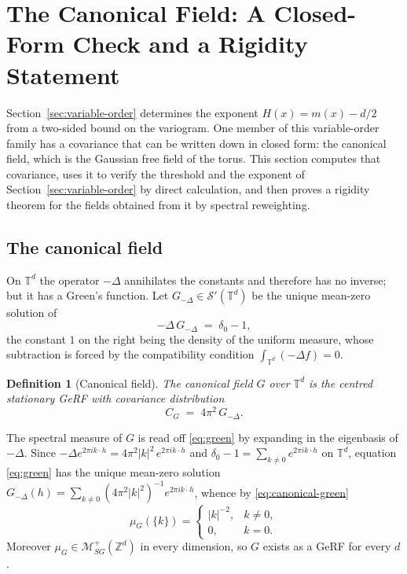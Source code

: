 \documentclass[pdflatex,sn-mathphys,Numbered]{sn-jnl}
\theoremstyle{thmstyleone}%
\theoremstyle{thmstyletwo}%
\theoremstyle{thmstylethree}%
\newtheorem{definition}[theorem]{Definition}%
\newcommand{\ZZ}{\mathbb{Z}}
\newcommand{\TT}{\mathbb{T}}
\newcommand{\calS}{\mathcal{S}}
\newcommand{\calM}{\mathcal{M}}
\begin{document}
\section{The Canonical Field: A Closed-Form Check and a Rigidity Statement}
\label{sec:canonical}

Section~\ref{sec:variable-order} determines the exponent $H(x) = m(x)-d/2$ from
a two-sided bound on the variogram. One member of this variable-order family has
a covariance that can be written down in closed form: the canonical field, which
is the Gaussian free field of the torus. This section computes that covariance,
uses it to verify the threshold and the exponent of
Section~\ref{sec:variable-order} by direct calculation, and then proves a
rigidity theorem for the fields obtained from it by spectral reweighting.

\subsection{The canonical field}

On $\TT^d$ the operator
$-\Delta$ annihilates the constants and therefore has no inverse; but it has
a Green's function. Let $G_{-\Delta} \in \calS'(\TT^d)$ be the unique mean-zero
solution of
\begin{equation}\label{eq:green}
    -\Delta\, G_{-\Delta} \;=\; \delta_0 - 1 ,
\end{equation}
the constant $1$ on the right being the density of the uniform measure, whose
subtraction is forced by the compatibility condition $\int_{\TT^d}(-\Delta f)=0$.

\begin{definition}[Canonical field] \label{def:canonical}
    The canonical field $G$ over $\TT^d$ is the centred stationary GeRF with
    covariance distribution
    \begin{equation}\label{eq:canonical-green}
        C_G \;=\; 4\pi^2\, G_{-\Delta} .
    \end{equation}
\end{definition}

The spectral measure of $G$ is read off \eqref{eq:green} by expanding in the
eigenbasis of $-\Delta$. Since $-\Delta e^{2\pi i k\cdot h} = 4\pi^2|k|^2\,
e^{2\pi i k\cdot h}$ and $\delta_0 - 1 = \sum_{k\neq0}e^{2\pi i k\cdot h}$ on
$\TT^d$, equation \eqref{eq:green} has the unique mean-zero solution
$G_{-\Delta}(h) = \sum_{k\neq0}(4\pi^2|k|^2)^{-1}e^{2\pi i k\cdot h}$, whence by
\eqref{eq:canonical-green}
\begin{equation}\label{canonical}
    \mu_G(\{k\}) = \begin{cases} |k|^{-2}, & k \neq 0, \\ 0, & k = 0 .\end{cases}
\end{equation}
Moreover
$\mu_G \in \calM^+_{SG}(\ZZ^d)$ in every dimension, so $G$ exists as a GeRF for
every $d$.
\end{document}
